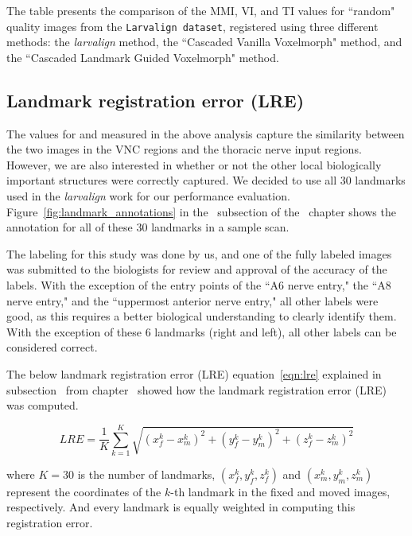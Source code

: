 \documentclass{book}
\begin{document}
	\begin{table}[h!]
		\centering
		
		\caption{The table presents the comparison of the MMI, VI, and TI values for ``random" quality images from the \texttt{Larvalign dataset}, registered using three different methods: the \textit{larvalign} method, the ``Cascaded Vanilla Voxelmorph" method, and the ``Cascaded Landmark Guided Voxelmorph" method.}
		\label{table:Quality_Random_Fresh}
	\end{table}

	\subsection{Landmark registration error (LRE)} \label{subsec:landmark_distance}
	The values for  and  measured in the above analysis capture the similarity between the two images in the VNC regions and the thoracic nerve input regions. However, we are also interested in whether or not the other local biologically important structures were correctly captured. We decided to use all 30 landmarks used in the \emph{larvalign} work for our performance evaluation. Figure~\ref{fig:landmark_annotations} in the~ subsection of the~ chapter shows the annotation for all of these 30 landmarks in a sample scan. 
	
	The labeling for this study was done by us, and one of the fully labeled images was submitted to the biologists for review and approval of the accuracy of the labels. With the exception of the entry points of the ``A6 nerve entry," the ``A8 nerve entry," and the ``uppermost anterior nerve entry," all other labels were good, as this requires a better biological understanding to clearly identify them. With the exception of these 6 landmarks (right and left), all other labels can be considered correct.
	
	The below landmark registration error (LRE) equation~\eqref{eqn:lre} explained in subsection~ from chapter~ showed how the landmark registration error (LRE) was computed.
	
	$$ LRE = \frac{1}{K} \sum_{k=1}^K \sqrt{(x_f^k - x_m^k)^2 + (y_f^k - y_m^k)^2 + (z_f^k - z_m^k)^2} $$
	
	where $K=30$ is the number of landmarks, $(x_f^k, y_f^k, z_f^k)$ and $(x_m^k, y_m^k, z_m^k)$ represent the coordinates of the $k$-th landmark in the fixed and moved images, respectively. And every landmark is equally weighted in computing this registration error.
	
\end{document}
